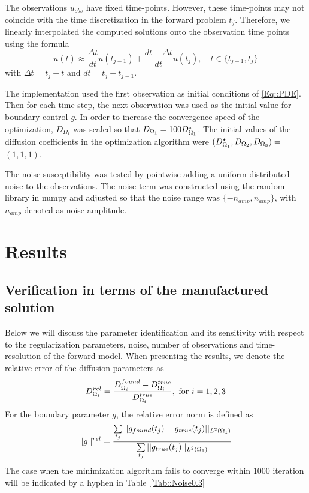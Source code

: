 \documentclass[11pt,a4paper]{article}
\begin{document}
The observations $u_{obs}$ have fixed time-points. However, these time-points may not coincide  with the time discretization in the forward problem $t_j$. Therefore, we linearly interpolated the computed solutions onto the observation time points using the formula
\begin{equation}
\label{observation:interpolation}
u(t) \approx \frac{\Delta t}{dt} u(t_{j-1}) + \frac{dt - \Delta t }{dt} u(t_{j}), \quad t \in \lbrace t_{j-1}, t_j \rbrace
\end{equation}
with $\Delta t = t_j-t$ and $dt = t_j - t_{j-1}$.

The implementation used the first observation as initial conditions of \eqref{Eq::PDE}. Then for each time-step, the next observation was used as the initial value for boundary control $g$. In order to increase the convergence speed of the optimization, $D_{\Omega_1}$ was scaled so that $D_{\Omega_1} = 100 D_{\Omega_1}\sp{\star} $. The initial values of the diffusion coefficients in the optimization algorithm were $(D_{\Omega_1}\sp{\star}, D_{\Omega_2}, D_{\Omega_3})=$  $(1, 1, 1)$. 

The noise susceptibility was tested by pointwise adding a uniform distributed noise to the observations. The noise term was constructed using the random library in numpy and adjusted so that the noise range was $\lbrace -n_{amp} , n_{amp} \rbrace $, with $n_{amp}$ denoted as noise amplitude.


\section{Results}

\subsection{Verification in terms of the manufactured solution}
Below we will discuss the parameter identification and its sensitivity with respect to the regularization parameters, noise, number of observations and time-resolution of the forward model. When presenting the results, we denote the relative error of the diffusion parameters as 
\begin{equation}
 D_{\Omega_i}\sp{rel} = \frac{D_{\Omega_i}\sp{found} -D_{\Omega_i}\sp{true} }{D_{\Omega_i}\sp{true} }, \text{ for } i=1,2,3
\end{equation}
For the boundary parameter $g$, the relative error norm is defined as 
\begin{equation}
|| g ||\sp{rel} = \frac{ \sum\limits_{t_j} || g_{found}(t_j) -g_{true}(t_j)||_{L^2(\Omega_1)} }{  \sum\limits_{t_j}||g_{true}(t_j)||_{L^2(\Omega_1)} }
\end{equation}
The case when the minimization algorithm fails to converge within 1000 iteration will be indicated by a hyphen in Table~\ref{Tab::Noise0.3}
\end{document}
